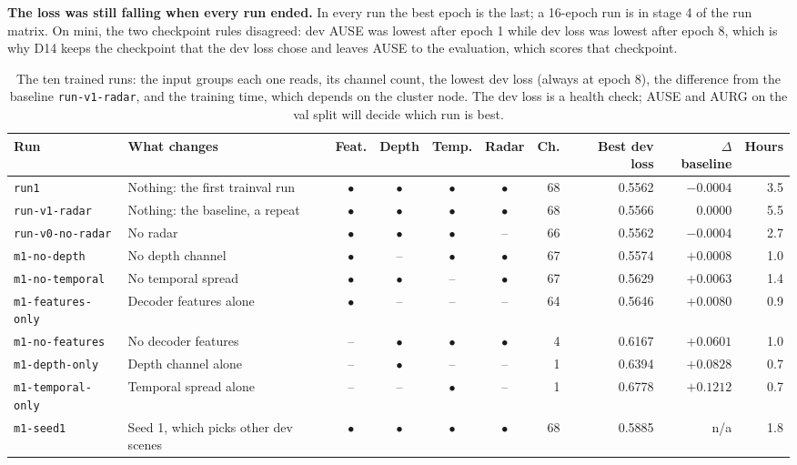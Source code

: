 \textbf{The loss was still falling when every run ended.} In every run the best epoch is the last; a 16-epoch run is in stage 4 of the run matrix. On mini, the two checkpoint rules disagreed: dev AUSE was lowest after epoch 1 while dev loss was lowest after epoch 8, which is why D14 keeps the checkpoint that the dev loss chose and leaves AUSE to the evaluation, which scores that checkpoint.

\begin{table}[t]
  \centering
  \small
  \setlength{\tabcolsep}{5pt}
  \begin{tabular}{@{}l l c c c c r r r r@{}}
    \toprule
    \textbf{Run} & \textbf{What changes} & \textbf{Feat.} & \textbf{Depth} & \textbf{Temp.} & \textbf{Radar} & \textbf{Ch.} & \textbf{Best dev loss} & \textbf{$\Delta$ baseline} & \textbf{Hours} \\
    \midrule
    \texttt{run1} & Nothing: the first trainval run & $\bullet$ & $\bullet$ & $\bullet$ & $\bullet$ & 68 & 0.5562 & $-0.0004$ & 3.5 \\
    \texttt{run-v1-radar} & Nothing: the baseline, a repeat & $\bullet$ & $\bullet$ & $\bullet$ & $\bullet$ & 68 & 0.5566 & $0.0000$ & 5.5 \\
    \texttt{run-v0-no-radar} & No radar & $\bullet$ & $\bullet$ & $\bullet$ & -- & 66 & 0.5562 & $-0.0004$ & 2.7 \\
    \texttt{m1-no-depth} & No depth channel & $\bullet$ & -- & $\bullet$ & $\bullet$ & 67 & 0.5574 & $+0.0008$ & 1.0 \\
    \texttt{m1-no-temporal} & No temporal spread & $\bullet$ & $\bullet$ & -- & $\bullet$ & 67 & 0.5629 & $+0.0063$ & 1.4 \\
    \texttt{m1-features-only} & Decoder features alone & $\bullet$ & -- & -- & -- & 64 & 0.5646 & $+0.0080$ & 0.9 \\
    \texttt{m1-no-features} & No decoder features & -- & $\bullet$ & $\bullet$ & $\bullet$ & 4 & 0.6167 & $+0.0601$ & 1.0 \\
    \texttt{m1-depth-only} & Depth channel alone & -- & $\bullet$ & -- & -- & 1 & 0.6394 & $+0.0828$ & 0.7 \\
    \texttt{m1-temporal-only} & Temporal spread alone & -- & -- & $\bullet$ & -- & 1 & 0.6778 & $+0.1212$ & 0.7 \\
    \texttt{m1-seed1} & Seed 1, which picks other dev scenes & $\bullet$ & $\bullet$ & $\bullet$ & $\bullet$ & 68 & 0.5885 & n/a & 1.8 \\
    \bottomrule
  \end{tabular}
  \caption{The ten trained runs: the input groups each one reads, its channel count, the lowest dev loss (always at epoch 8), the difference from the baseline \texttt{run-v1-radar}, and the training time, which depends on the cluster node. The dev loss is a health check; AUSE and AURG on the val split will decide which run is best.}
  \label{tab:runs}
\end{table}

